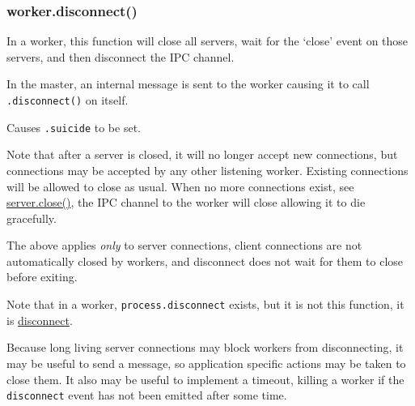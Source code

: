 \subsubsection{worker.disconnect()}\label{worker.disconnect}

In a worker, this function will close all servers, wait for the `close'
event on those servers, and then disconnect the IPC channel.

In the master, an internal message is sent to the worker causing it to
call \texttt{.disconnect()} on itself.

Causes \texttt{.suicide} to be set.

Note that after a server is closed, it will no longer accept new
connections, but connections may be accepted by any other listening
worker. Existing connections will be allowed to close as usual. When no
more connections exist, see
\href{net.html\#net_event_close}{server.close()}, the IPC channel to the
worker will close allowing it to die gracefully.

The above applies \emph{only} to server connections, client connections
are not automatically closed by workers, and disconnect does not wait
for them to close before exiting.

Note that in a worker, \texttt{process.disconnect} exists, but it is not
this function, it is
\href{child_process.html\#child_process_child_disconnect}{disconnect}.

Because long living server connections may block workers from
disconnecting, it may be useful to send a message, so application
specific actions may be taken to close them. It also may be useful to
implement a timeout, killing a worker if the \texttt{disconnect} event
has not been emitted after some time.


